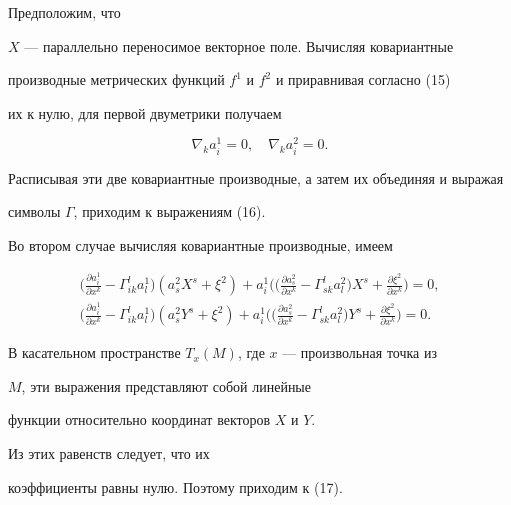 \begin{pf}


Предположим, что


$X$ --- параллельно переносимое векторное поле. Вычисляя ковариантные


производные метрических функций $f^1$ и $f^2$ и приравнивая согласно (15)


их к нулю, для первой двуметрики получаем


$$


\nabla_ka^1_i=0,\quad \nabla_ka^2_i=0.


$$


Расписывая эти две ковариантные производные, а затем их объединяя и выражая


символы $\Gamma$, приходим к выражениям (16).


Во втором случае вычисляя ковариантные производные, имеем


\begin{gather*}


\bigg(\frac{\partial a^1_i}{\partial x^k} - \Gamma^{l}_{ik}


a^1_l\bigg)(a^2_sX^s+\xi^2)+a^1_i\bigg(\bigg(\frac{\partial a^2_s}{\partial


x^k}-\Gamma^{l}_{sk}a^2_l\bigg)X^s+\frac{\partial \xi^2}{\partial


x^k}\bigg)=0, \\


%


\bigg(\frac{\partial a^1_i}{\partial x^k} - \Gamma^{l}_{ik}


a^1_l\bigg)(a^2_sY^s+\xi^2)+a^1_i\bigg(\bigg(\frac{\partial a^2_s}{\partial


x^k} - \Gamma^{l}_{sk}a^2_l\bigg)Y^s+\frac{\partial \xi^2}{\partial


x^k}\bigg)=0.


\end{gather*}


В касательном пространстве $T_x(M)$, где $x$ --- произвольная точка из


$M$, эти выражения представляют собой линейные


функции относительно координат векторов $X$ и $Y$.


Из этих равенств следует, что их


коэффициенты равны нулю. Поэтому приходим к (17).


\end{pf}








